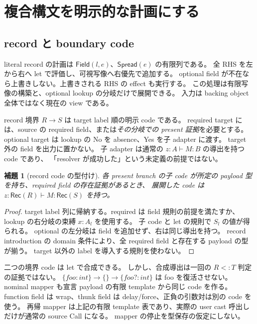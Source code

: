 \documentclass[11pt,a4paper]{article}
\newtheorem{lemma}[definition]{補題}
\newcommand{\ty}{\mathrel{\vdash}}
\begin{document}
\section{複合構文を明示的な計画にする}
\label{sec:patterns}

\subsection{record と boundary code}

literal record の計画は \(\mathsf{Field}(l,e)\)、\(\mathsf{Spread}(e)\) の有限列である。
全 RHS を左から右へ let で評価し、可視写像へ右優先で追加する。
optional field が不在なら上書きしない。上書きされる RHS の effect も実行する。
この処理は有限写像の構築と、optional lookup の分岐だけで展開できる。
入力は backing object 全体ではなく現在の view である。

record 境界 \(R\to S\) は target label 順の明示 code である。
required target には、source の required field、または\emph{その分岐での present 証拠}を必要とする。
optional target は lookup の No を absence、Yes を子 adapter に渡す。
target 外の field を出力に置かない。
子 adapter は通常の \(z:A\ty M:B\) の導出を持つ code であり、
「resolver が成功した」という未定義の前提ではない。

\begin{lemma}[record code の型付け]
各 present branch の子 code が所定の payload 型を持ち、required field の存在証拠があるとき、
展開した code は \(z:\mathsf{Rec}(R)\ty M:\mathsf{Rec}(S)\) を持つ。
\end{lemma}
\begin{proof}
target label 列に帰納する。required は field 規則の前提を満たすか、
lookup の右分岐の束縛 \(x:A_l\) を使用する。
子 code と let の規則で \(S_l\) の値が得られる。
optional の左分岐は field を追加せず、右は同じ導出を持つ。
record introduction の domain 条件により、全 required field と存在する payload の型が揃う。
target 以外の label を導入する規則を使わない。
\end{proof}

二つの境界 code は let で合成できる。
しかし、合成導出は一回の \(R<:T\) 判定の証拠ではない。
\(\{foo:int\}\to\{\}\to\{foo?:int\}\) は foo を復活させない。
nominal mapper も宣言 payload の有限 template から同じ code を作る。
function field は wrap、thunk field は delay/force、正負の引数対は別の code を使う。
再帰 mapper は上記の有限 template 表であり、実際の user cast 呼出しだけが通常の source Call になる。
mapper の停止を型保存の仮定にしない。
\end{document}
